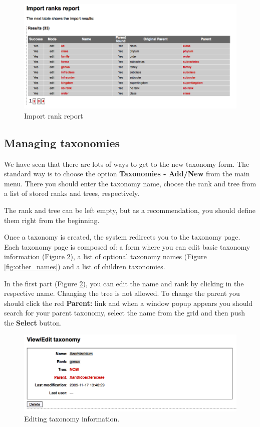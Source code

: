 \begin{figure}[H]
  \centering
    \includegraphics[scale=0.4]{rank_import.png}
  \caption{Import rank report}
  \label{fig:rank_import}
\end{figure}

\subsection{Managing taxonomies}

We have seen that there are lots of ways to get to the new taxonomy form. The standard way is to
choose the option \textbf{Taxonomies - Add/New} from the main menu. There you should enter the
taxonomy name, choose the rank and tree from a list of stored ranks and trees, respectively.

The rank and tree can be left empty, but as a recommendation, you should define them right
from the beginning.

Once a taxonomy is created, the system redirects you to the taxonomy page.
Each taxonomy page is composed of: a form where you can edit basic taxonomy information (Figure \ref{fig:taxonomy_basic}),
a list of optional taxonomy names (Figure \ref{fig:other_names}) and a list of children taxonomies.

In the first part (Figure \ref{fig:taxonomy_basic}), you can edit the name and rank by clicking in the respective name.
Changing the tree is not allowed. To change the parent you should click the red \textbf{Parent:} link and when
a window popup appears you should search for your parent taxonomy, select the name from the grid and then push
the \textbf{Select} button.

\begin{figure}[H]
  \centering
    \includegraphics[scale=0.4]{taxonomy_basic.png}
  \caption{Editing taxonomy information.}
  \label{fig:taxonomy_basic}
\end{figure}

